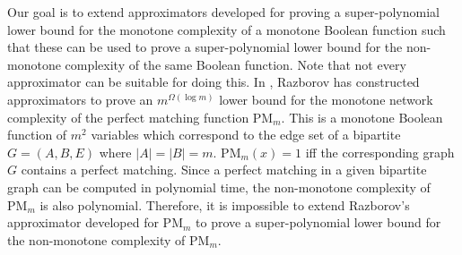 \documentclass[11pt]{article}
\begin{document}
Our goal is to extend approximators developed for proving a super-polynomial lower bound for the
monotone complexity of a monotone Boolean function such that these can be used to prove a super-polynomial
lower bound for the non-monotone complexity of the same Boolean function. Note that not every
approximator can be suitable for doing this. In \cite{Ra3}, Razborov has constructed approximators
to prove an $m^{\Omega(\log m)}$ lower bound for the monotone network complexity of the perfect matching
function $\mbox{PM}_m$. This is a monotone Boolean function of $m^2$ variables which correspond to the edge set
of a bipartite $G = (A,B,E)$ where $|A| = |B| = m$. $\mbox{PM}_m(x) = 1$ iff the corresponding graph $G$
contains a perfect matching. Since a perfect matching in a given bipartite graph can be computed
in polynomial time, the non-monotone complexity of $\mbox{PM}_m$ is also polynomial. Therefore, it is impossible
to extend Razborov's approximator developed for $\mbox{PM}_m$ to prove a super-polynomial lower bound for
the non-monotone complexity of $\mbox{PM}_m$.
\end{document}
